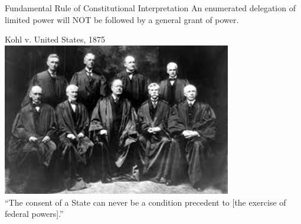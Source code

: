 \begin{frame}
    \begin{varblock}[.9\textwidth]{Fundamental Rule of Constitutional Interpretation}
        An enumerated delegation of limited power will NOT be followed by a general grant of power.
    \end{varblock}
\end{frame}

\begin{frame}{Kohl v. United States, 1875}
    \centering
    \includegraphics[width=0.75\textwidth]{img/sc-1905.png} \\
    { \large ``The consent of a State can never be a condition precedent to [the exercise of federal powers].'' }
\end{frame}


